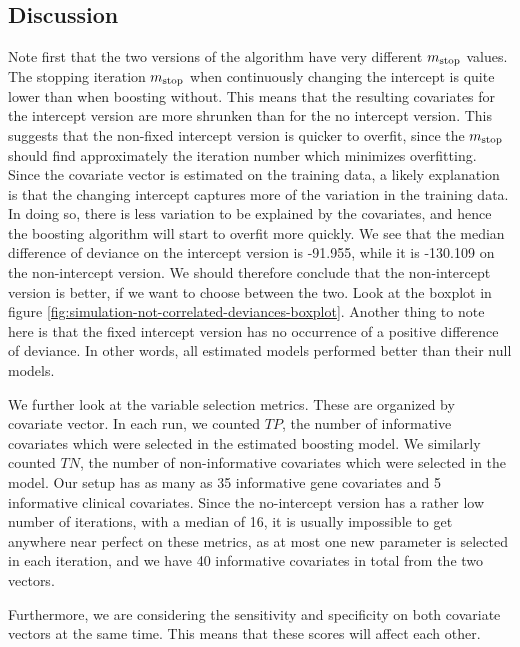 \subsection{Discussion}
Note first that the two versions of the algorithm have very different $m_{\text{stop}}$ values.
The stopping iteration $m_{\text{stop}}$ when continuously changing the intercept is quite lower than when boosting without.
This means that the resulting covariates for the intercept version are more shrunken than for the no intercept version.
This suggests that the non-fixed intercept version is quicker to overfit, since the $m_{\text{stop}}$ should find approximately the iteration number which minimizes overfitting.
Since the covariate vector is estimated on the training data, a likely explanation is that the changing intercept captures more of the variation in the training data.
In doing so, there is less variation to be explained by the covariates, and hence the boosting algorithm will start to overfit more quickly.
We see that the median difference of deviance on the intercept version is -91.955, while it is -130.109 on the non-intercept version.
We should therefore conclude that the non-intercept version is better, if we want to choose between the two.
Look at the boxplot in figure \ref{fig:simulation-not-correlated-deviances-boxplot}.
Another thing to note here is that the fixed intercept version has no occurrence of a positive difference of deviance.
In other words, all estimated models performed better than their null models.

We further look at the variable selection metrics.
These are organized by covariate vector.
In each run, we counted $TP$, the number of informative covariates which were selected in the estimated boosting model.
We similarly counted $TN$, the number of non-informative covariates which were selected in the model.
Our setup has as many as 35 informative gene covariates and 5 informative clinical covariates.
Since the no-intercept version has a rather low number of iterations, with a median of 16, it is usually impossible to get anywhere near perfect on these metrics, as at most one new parameter is selected in each iteration, and we have 40 informative covariates in total from the two vectors.

Furthermore, we are considering the sensitivity and specificity on both covariate vectors at the same time.
This means that these scores will affect each other.

